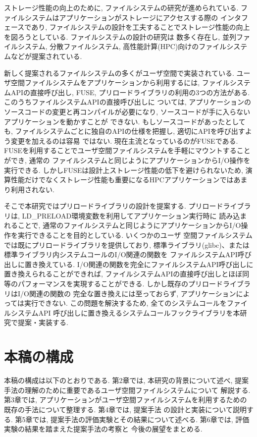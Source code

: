 \documentclass[a4paper,11pt]{jreport}
\begin{document}
ストレージ性能の向上のために, ファイルシステムの研究が進められている. ファイルシステムはアプリケーションがストレージにアクセスする際の
インタフェースであり, ファイルシステムの設計を工夫することでストレージ性能の向上を図ろうとしている. ファイルシステムの設計の研究は
数多く存在し, 並列ファイルシステム, 分散ファイルシステム, 高性能計算(HPC)向けのファイルシステムなどが提案されている. 

新しく提案されるファイルシステムの多くがユーザ空間で実装されている. ユーザ空間ファイルシステムをアプリケーションから利用するには, 
ファイルシステムAPIの直接呼び出し, FUSE, プリロードライブラリの利用の3つの方法がある. このうちファイルシステムAPIの直接呼び出しに
ついては, アプリケーションのソースコードの変更と再コンパイルが必要になり, ソースコードが手に入らないアプリケーションを動かすことが
できない. もしソースコードがあったとしても, ファイルシステムごとに独自のAPIの仕様を把握し, 適切にAPIを呼び出すよう変更を加えるのは容易
ではない. 現在主流となっているのがFUSEである. FUSEを利用することでユーザ空間ファイルシステムを手軽にマウントすることができ, 通常の
ファイルシステムと同じようにアプリケーションからI/O操作を実行できる. しかしFUSEは設計上ストレージ性能の低下を避けられないため, 
演算性能だけでなくストレージ性能も重要になるHPCアプリケーションではあまり利用されない. 

そこで本研究ではプリロードライブラリの設計を提案する. プリロードライブラリは, LD\_PRELOAD環境変数を利用してアプリケーション実行時に
読み込まれることで, 通常のファイルシステムと同じようにアプリケーションからI/O操作を実行できることを目的としている. いくつかのユーザ
空間ファイルシステムでは既にプリロードライブラリを提供しており, 標準ライブラリ(glibc)、または標準ライブラリ内システムコールのI/O関連の関数を
ファイルシステムAPI呼び出しに置き換えている. I/O関連の関数を完全にファイルシステムAPI呼び出しに置き換えられることができれば, 
ファイルシステムAPIの直接呼び出しとほぼ同等のパフォーマンスを実現することができる. しかし既存のプリロードライブラリはI/O関連の関数の
完全な置き換えには至っておらず, アプリケーションによっては実行できない. この問題を解決するため, 全てのシステムコールをファイルシステムAPI
呼び出しに置き換えるシステムコールフックライブラリを本研究で提案・実装する.

\section{本稿の構成}
本稿の構成は以下のとおりである. 第2章では, 本研究の背景について述べ, 提案手法の理解のために重要であるユーザ空間ファイルシステムについて
解説する. 第3章では, アプリケーションがユーザ空間ファイルシステムを利用するための既存の手法について整理する. 第4章では, 提案手法
の設計と実装について説明する. 第5章では, 提案手法の評価実験とその結果について述べる. 第6章では, 評価実験の結果を踏まえた提案手法の考察と
今後の展望をまとめる.
\end{document}
